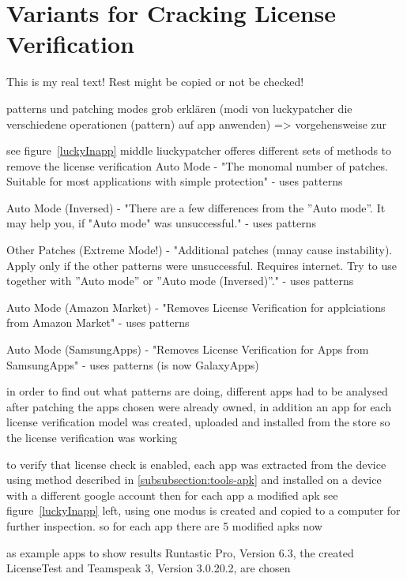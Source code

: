 \section{Variants for Cracking License Verification} \label{section:luckypatcher-modi}
This is my real text! Rest might be copied or not be checked!



%
patterns und patching modes grob erklären (modi von luckypatcher die verschiedene operationen (pattern) auf app anwenden) => vorgehensweise zur\newline

see figure~\ref{luckyInapp} middle liuckypatcher offeres different sets of methods to remove the license verification
Auto Mode - "The monomal number of patches. Suitable for most applications with simple protection" - uses patterns

Auto Mode (Inversed) - "There are a few differences from the ”Auto mode”. It may help you, if "Auto mode" was unsuccessful." - uses patterns

Other Patches (Extreme Mode!) - "Additional patches (mnay cause instability). Apply only if the other patterns were unsuccessful. Requires internet. Try to use together with ”Auto mode” or ”Auto mode (Inversed)”." - uses patterns

Auto Mode (Amazon Market) - "Removes License Verification for applciations from Amazon Market" - uses patterns

Auto Mode (SamsungApps) - "Removes License Verification for Apps from SamsungApps" - uses patterns  (is now GalaxyApps)


in order to find out what patterns are doing, different apps had to be analysed after patching
the apps chosen were already owned, in addition an app for each license verification model was created, uploaded and installed from the store so the license verification was working

to verify that license check is enabled, each app was extracted from the device using method described in \ref{subsubsection:tools-apk} and installed on a device with a different google account
then for each app a modified apk see figure~\ref{luckyInapp} left, using one modus is created and copied to a computer for further inspection. so for each app there are 5 modified apks now


as example apps to show results Runtastic Pro\cite{runtasticApp}, Version 6.3, the created LicenseTest and Teamspeak 3\cite{teamspeakApp}, Version 3.0.20.2, are chosen

